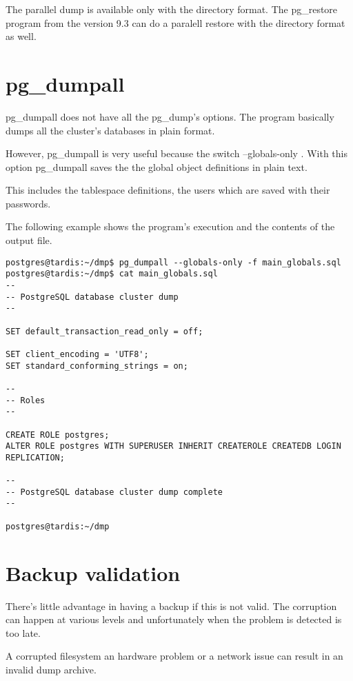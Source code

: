 The parallel dump is available only with the directory format. The pg\_restore program 
from the version 9.3 can do a paralell restore with the directory format as well.

\section{pg\_dumpall}
pg\_dumpall does not have all the pg\_dump's options. The program basically dumps all the 
cluster's databases in plain format.\newline

However, pg\_dumpall  is very useful because the switch --globals-only . 
With this option pg\_dumpall saves the the global object definitions in plain text.\newline

This includes the tablespace definitions, the users which are saved with their passwords. 

The following example shows the program's execution and the contents of the output file.
\begin{lstlisting}[style=pgsql]
postgres@tardis:~/dmp$ pg_dumpall --globals-only -f main_globals.sql
postgres@tardis:~/dmp$ cat main_globals.sql 
--
-- PostgreSQL database cluster dump
--

SET default_transaction_read_only = off;

SET client_encoding = 'UTF8';
SET standard_conforming_strings = on;

--
-- Roles
--

CREATE ROLE postgres;
ALTER ROLE postgres WITH SUPERUSER INHERIT CREATEROLE CREATEDB LOGIN REPLICATION;

--
-- PostgreSQL database cluster dump complete
--

postgres@tardis:~/dmp

\end{lstlisting}


\section{Backup validation}
There's little advantage in having a backup if this is not valid. The corruption can happen at 
various levels and unfortunately when the problem is detected is too late.\newline 

A corrupted filesystem an hardware problem or a network issue can result in an invalid dump archive. 


